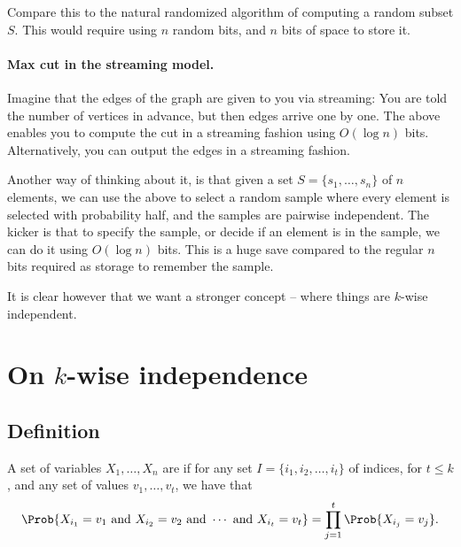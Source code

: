 Compare this to the natural randomized algorithm of computing a random
subset $S$. This would require using $n$ random bits, and $n$ bits of
space to store it.


\paragraph*{Max cut in the streaming model.}

Imagine that the edges of the graph are given to you via streaming:
You are told the number of vertices in advance, but then edges arrive
one by one. The above enables you to compute the cut in a streaming
fashion using $O( \log n)$ bits. Alternatively, you can output the
edges in a streaming fashion.

Another way of thinking about it, is that given a set
$S=\{s_1, \ldots, s_n\}$ of $n$ elements, we can use the above to
select a random sample where every element is selected with
probability half, and the samples are pairwise independent. The kicker
is that to specify the sample, or decide if an element is in the
sample, we can do it using $O( \log n)$ bits. This is a huge save
compared to the regular $n$ bits required as storage to remember the
sample.

It is clear however that we want a stronger concept -- where things
are $k$-wise independent.




\section{On $k$-wise independence}

\subsection{Definition}

\begin{defn}
    A set of variables $X_1, \ldots, X_n$ are  if for any set $I = \{i_1, i_2, \ldots, i_t\}$ of
    indices, for $t \leq k$, and any set of values $v_1, \ldots, v_t$,
    we have that
    \begin{equation*}
        \Prob{
           X_{i_1} = v_1 \text{ and }
           X_{i_2} = v_2 \text{ and } \cdots \text{ and }
           X_{i_t} = v_t}%
        =%
        \prod_{j=1}^t        
        \Prob{X_{i_j} = v_j}.
    \end{equation*}
\end{defn}

